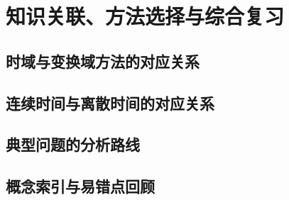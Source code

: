 \chapter{知识关联、方法选择与综合复习}
\label{chap:connections-and-review}

\section{时域与变换域方法的对应关系}
\section{连续时间与离散时间的对应关系}
\section{典型问题的分析路线}
\section{概念索引与易错点回顾}
